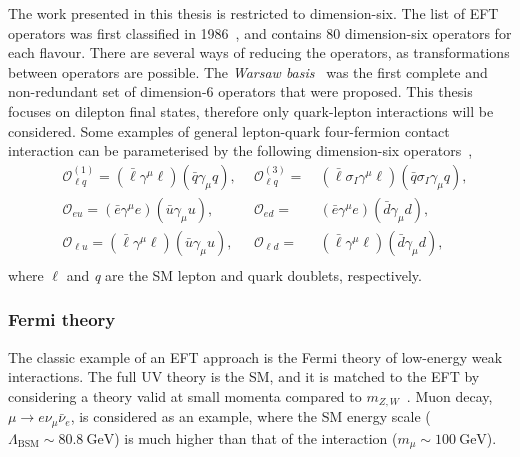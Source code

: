 The work presented in this thesis is restricted to dimension-six. The list of EFT operators was first classified in 1986~\cite{Buchmuller:163116}, and contains 80 dimension-six operators for each flavour. There are several ways of reducing the operators, as transformations between operators are possible. The \emph{Warsaw basis}~\cite{Grzadkowski_2010} was the first complete and non-redundant set of dimension-6 operators that were proposed. This thesis focuses on dilepton final states, therefore only quark-lepton interactions will be considered. Some examples of general lepton-quark four-fermion contact interaction can be parameterised by the following dimension-six operators~\cite{de_Blas_2013},
\begin{equation}
    \label{eq:CIop}
    \begin{aligned}
        & \mathcal{O}^{(1)}_{\ell q} = (\bar{\ell}\gamma^\mu \ell)(\bar{q}\gamma_\mu q),~~ &\mathcal{O}^{(3)}_{\ell q} =& ~(\bar{\ell}\sigma_I\gamma^\mu \ell)(\bar{q}\sigma_I\gamma_\mu q), \\
        & \mathcal{O}_{eu} = (\bar{e}\gamma^\mu e)(\bar{u}\gamma_\mu u),~~ &\mathcal{O}_{e d} =& ~(\bar{e}\gamma^\mu e)(\bar{d}\gamma_\mu d), \\
        & \mathcal{O}_{\ell u} = (\bar{\ell}\gamma^\mu \ell)(\bar{u}\gamma_\mu u),~~ &\mathcal{O}_{\ell d} =& ~(\bar{\ell}\gamma^\mu \ell)(\bar{d}\gamma_\mu d), \\
     \end{aligned}
\end{equation}
where $\ell$ and  \emph{q} are the SM lepton and quark doublets, respectively.


\subsubsection{Fermi theory}
The classic example of an EFT approach is the Fermi theory of low-energy weak interactions. The full UV theory is the SM, and it is matched to the EFT by considering a theory valid at small momenta compared to $m_{Z,W}$~\cite{manohar2018introduction}. Muon decay, $\mu \rightarrow e\nu_\mu\bar{\nu}_e$, is considered as an example, where the SM energy scale ($\Lambda_{\mathrm{BSM}}\sim\SI{80.8}{\giga\electronvolt}$) is much higher than that of the interaction ($m_\mu \sim \SI{100}{\giga\electronvolt}$). 

